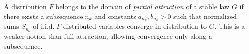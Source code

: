 A distribution $F$ belongs to the domain of \textit{partial attraction} of a stable law $G$ if there exists a subsequence $n_k$ and constants $a_{n_k}, b_{n_k} > 0$ such that normalized sums $S_{n_k}$ of i.i.d. $F$-distributed variables converge in distribution to $G$. This is a weaker notion than full attraction, allowing convergence only along a subsequence.
